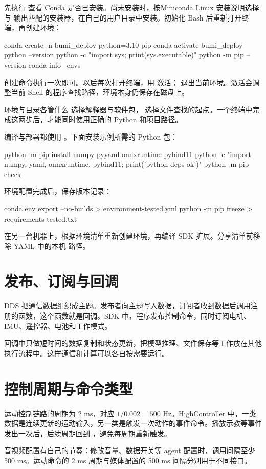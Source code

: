 先执行  查看 Conda 是否已安装。尚未安装时，按\href{https://www.anaconda.com/docs/getting-started/miniconda/install/linux-install}{Miniconda Linux 安装说明}选择与  输出匹配的安装器，在自己的用户目录中安装。初始化 Bash 后重新打开终端，再创建环境：
\par\noindent\begin{minipage}{\linewidth}
\begin{command}
conda create -n bumi_deploy python=3.10 pip
conda activate bumi_deploy
python --version
python -c "import sys; print(sys.executable)"
python -m pip --version
conda info --envs
\end{command}
\end{minipage}\par

创建命令执行一次即可。以后每次打开终端，用  激活； 退出当前环境。激活会调整当前 Shell 的程序查找路径，环境本身仍保存在磁盘上。
\begin{concept}{环境与目录各管什么}
 选择解释器与软件包， 选择文件查找的起点。一个终端中完成这两步后，才能同时使用正确的 Python 和项目路径。
\end{concept}
编译与部署都使用 。下面安装示例所需的 Python 包：
\par\noindent\begin{minipage}{\linewidth}
\begin{command}
python -m pip install numpy pyyaml onnxruntime pybind11
python -c "import numpy, yaml, onnxruntime, pybind11; print('python deps ok')"
python -m pip check
\end{command}
\end{minipage}\par

环境配置完成后，保存版本记录：
\par\noindent\begin{minipage}{\linewidth}
\begin{command}
conda env export --no-builds > environment-tested.yml
python -m pip freeze > requirements-tested.txt
\end{command}
\end{minipage}\par

在另一台机器上，根据环境清单重新创建环境，再编译 SDK 扩展。分享清单前移除 YAML 中的本机  路径。
\section{发布、订阅与回调}
DDS 把通信数据组织成主题。发布者向主题写入数据，订阅者收到数据后调用注册的函数，这个函数就是回调。SDK 中，程序发布控制命令，同时订阅电机、IMU、遥控器、电池和工作模式。

回调中只做短时间的数据复制和状态更新，把模型推理、文件保存等工作放在其他执行流程中。这样通信和计算可以各自按需要运行。
\section{控制周期与命令类型}
运动控制链路的周期为 2 ms，对应 $1/0.002=500$ Hz。HighController 中，一类数据是连续更新的运动输入，另一类是触发一次动作的事件命令。播放示教等事件发出一次后，后续周期回到 ，避免每周期重新触发。

音视频配置有自己的节奏：修改音量、数据开关等 agent 配置时，调用间隔至少 500 ms。运动命令的 2 ms 周期与媒体配置的 500 ms 间隔分别用于不同接口。
